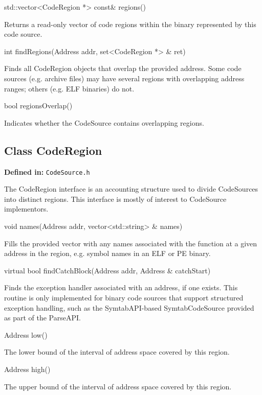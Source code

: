 \documentclass{article}
\newenvironment{apient}{\small\verbatim}{\endverbatim}
\newcommand{\apidesc}[1]{%
{\addtolength{\leftskip}{4em}%
#1\par\medskip}
}
\newcommand{\definedin}[1]{%
\textbf{Defined in:} \texttt{#1}
}
\begin{document}
\begin{apient}
std::vector<CodeRegion *> const& regions()
\end{apient}
\apidesc{Returns a read-only vector of code regions within the binary represented by this code source.}

\begin{apient}
int findRegions(Address addr, set<CodeRegion *> & ret)
\end{apient}
\apidesc{Finds all CodeRegion objects that overlap the provided address. Some code sources (e.g. archive files) may have several regions with overlapping address ranges; others (e.g. ELF binaries) do not.}

\begin{apient}
bool regionsOverlap() 
\end{apient}
\apidesc{Indicates whether the CodeSource contains overlapping regions.}

\subsection{Class CodeRegion}

\definedin{CodeSource.h}

The CodeRegion interface is an accounting structure used to divide CodeSources into distinct regions. This interface is mostly of interest to CodeSource implementors.

\begin{apient}
void names(Address addr, vector<std::string> & names)
\end{apient}
\apidesc{Fills the provided vector with any names associated with the function at a given address in the region, e.g. symbol names in an ELF or PE binary.}

\begin{apient}
virtual bool findCatchBlock(Address addr, Address & catchStart)
\end{apient}
\apidesc{Finds the exception handler associated with an address, if one exists. This routine is only implemented for binary code sources that support structured exception handling, such as the SymtabAPI-based SymtabCodeSource provided as part of the ParseAPI.}

\begin{apient}
Address low()
\end{apient}
\apidesc{The lower bound of the interval of address space covered by this region.}

\begin{apient}
Address high()
\end{apient}
\apidesc{The upper bound of the interval of address space covered by this region.}
\end{document}
